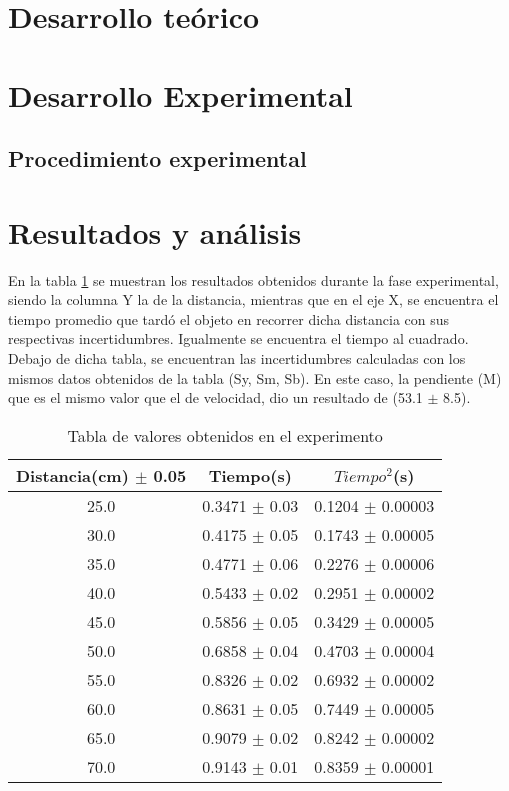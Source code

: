\documentclass{article}
\begin{document}
\begin{multicols}{2}

\section{Desarrollo teórico}\label{Desarrollo Teorico}                              	%

\section{Desarrollo Experimental}\label{Desarrollo experimental}				%

\subsection{Procedimiento experimental}\label{Procedimiento experimental}

\end{multicols}
\section{Resultados y análisis}\label{Resultados}			%
En la tabla \ref{table:1} se muestran los resultados obtenidos durante la fase experimental, siendo la columna Y la de la distancia, mientras que en el eje X, se encuentra el tiempo promedio que tardó el objeto en recorrer dicha distancia con sus respectivas incertidumbres. Igualmente se encuentra el tiempo al cuadrado. Debajo de dicha tabla, se encuentran las incertidumbres calculadas con los mismos datos obtenidos de la tabla (Sy, Sm, Sb). En este caso, la pendiente (M) que es el mismo valor que el de velocidad, dio un resultado de (53.1 $\pm$ 8.5). 

\begin{table}[H]
	\centering
	\begin{tabular}{|c|c|c|}
		\hline
		Distancia(cm) $\pm$ 0.05 & Tiempo(s) & $Tiempo^2$(s) \\
		\hline
		25.0 & 0.3471 $\pm$ 0.03 & 0.1204 $\pm$ 0.00003 \\
		\hline
		30.0 & 0.4175 $\pm$ 0.05 & 0.1743 $\pm$ 0.00005 \\
		\hline
		35.0 & 0.4771 $\pm$ 0.06 & 0.2276 $\pm$ 0.00006 \\
		\hline
		40.0 & 0.5433 $\pm$ 0.02 & 0.2951 $\pm$ 0.00002 \\
		\hline
		45.0 & 0.5856 $\pm$ 0.05 & 0.3429 $\pm$ 0.00005 \\
		\hline
		50.0 & 0.6858 $\pm$ 0.04 & 0.4703 $\pm$ 0.00004 \\
		\hline
		55.0 & 0.8326 $\pm$ 0.02 & 0.6932 $\pm$ 0.00002 \\
		\hline
		60.0 & 0.8631 $\pm$ 0.05 & 0.7449 $\pm$ 0.00005 \\
		\hline
		65.0 & 0.9079 $\pm$ 0.02 & 0.8242 $\pm$ 0.00002 \\
		\hline
		70.0 & 0.9143 $\pm$ 0.01 & 0.8359 $\pm$ 0.00001 \\
		\hline
	\end{tabular}
	\caption{Tabla de valores obtenidos en el experimento}
	\label{table:1}
\end{table}
\end{document}
